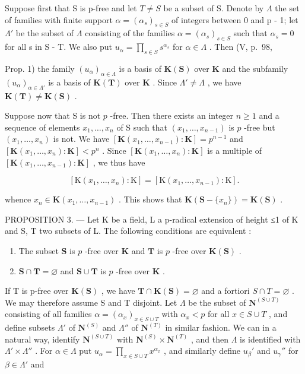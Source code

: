 Suppose first that S is p-free and let \(T \neq S\) be a subset of S. Denote by \(\Lambda\) the set of families with finite support \(\alpha = (\alpha_{s})_{s \in S}\) of integers between 0 and p - 1; let \(\Lambda'\) be the subset of \(\Lambda\) consisting of the families \(\alpha = (\alpha_{s})_{s \in S}\) such that \(\alpha_{s} = 0\) for all s in S - T. We also put \(u_{\alpha} = \prod_{s \in S} s^{\alpha_{s}}\) for \(\alpha \in \Lambda\) . Then (V, p.~98,

Prop. 1) the family \((u_{\alpha})_{\alpha \in \Lambda}\) is a basis of \(\mathbf{K}(\mathbf{S})\) over \(\mathbf{K}\) and the subfamily \((u_{\alpha})_{\alpha \in \Lambda'}\) is a basis of \(\mathbf{K}(\mathbf{T})\) over \(\mathbf{K}\) . Since \(\Lambda' \neq \Lambda\) , we have \(\mathbf{K}(\mathbf{T}) \neq \mathbf{K}(\mathbf{S})\) .

Suppose now that S is not \(p\) -free. Then there exists an integer \(n \geqslant 1\) and a sequence of elements \(x_1, \ldots, x_n\) of S such that \((x_1, \ldots, x_{n-1})\) is \(p\) -free but \((x_1, \ldots, x_n)\) is not. We have \([\mathbf{K}(x_1, \ldots, x_{n-1}) : \mathbf{K}] = p^{n-1}\) and \([\mathbf{K}(x_1, \ldots, x_n) : \mathbf{K}] < p^n\) . Since \([\mathbf{K}(x_1, \ldots, x_n) : \mathbf{K}]\) is a multiple of \([\mathbf{K}(x_1, \ldots, x_{n-1}) : \mathbf{K}]\) , we thus have

\[
[ \mathrm{K} (x _ {1}, \dots , x _ {n}): \mathrm{K} ] = [ \mathrm{K} (x _ {1}, \dots , x _ {n - 1}): \mathrm{K} ].
\]

whence \(x_{n} \in \mathbf{K}(x_{1}, \ldots, x_{n-1})\) . This shows that \(\mathbf{K}(\mathbf{S} - \{x_{n}\}) = \mathbf{K}(\mathbf{S})\) .

PROPOSITION 3. --- Let K be a field, L a p-radical extension of height ≤1 of K and S, T two subsets of L. The following conditions are equivalent :

\begin{enumerate}
\def\labelenumi{\alph{enumi})}
\item
  The subset \(\mathbf{S}\) is \(p\) -free over \(\mathbf{K}\) and \(\mathbf{T}\) is \(p\) -free over \(\mathbf{K}(\mathbf{S})\) .
\item
  \(\mathbf{S} \cap \mathbf{T} = \varnothing\) and \(\mathbf{S} \cup \mathbf{T}\) is \(p\) -free over \(\mathbf{K}\) .
\end{enumerate}

If T is p-free over \(\mathbf{K}(\mathbf{S})\) , we have \(\mathbf{T} \cap \mathbf{K}(\mathbf{S}) = \varnothing\) and a fortiori \(S \cap T = \varnothing\) . We may therefore assume S and T disjoint. Let \(\Lambda\) be the subset of \(\mathbf{N}^{(S \cup T)}\) consisting of all families \(\alpha = (\alpha_x)_{x \in S \cup T}\) with \(\alpha_x < p\) for all \(x \in S \cup T\) , and define subsets \(\Lambda'\) of \(\mathbf{N}^{(S)}\) and \(\Lambda''\) of \(\mathbf{N}^{(T)}\) in similar fashion. We can in a natural way, identify \(\mathbf{N}^{(S \cup T)}\) with \(\mathbf{N}^{(S)} \times \mathbf{N}^{(T)}\) , and then \(\Lambda\) is identified with \(\Lambda' \times \Lambda''\) . For \(\alpha \in \Lambda\) put \(u_\alpha = \prod_{x \in S \cup T} x^{\alpha_x}\) , and similarly define \(u_\beta'\) and \(u_\gamma''\) for \(\beta \in \Lambda'\) and

